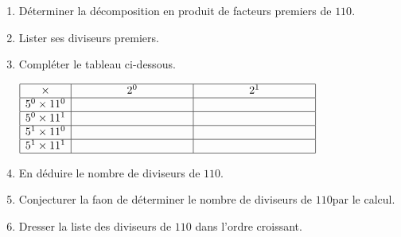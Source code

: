 \begin{exercice*}
    \begin{enumerate}
        \item Déterminer la décomposition en produit de facteurs premiers de $110$.
        \item Lister ses diviseurs premiers.
        \item Compléter le tableau ci-dessous.
        
        \smallskip
        $\renewcommand{\arraystretch}{1}
        \begin{array}{|c|c|c|}
        \hline
        \times & \phantom{plusLarge}2^{0}\phantom{plusLarge} & \phantom{plusLarge}2^{1}\phantom{plusLarge}\\
        \hline
        5^{0}\times11^{0} &  & \\
        \hline
        5^{0}\times11^{1} &  & \\
        \hline
        5^{1}\times11^{0} &  & \\
        \hline
        5^{1}\times11^{1} &  & \\
        \hline
        \end{array}
        \renewcommand{\arraystretch}{1}$
        \smallskip

        \item En déduire le nombre de diviseurs de $110$.
        \item Conjecturer la faon de déterminer le nombre de diviseurs de $110$par le calcul.
        \item Dresser la liste des diviseurs de $110$ dans l'ordre croissant.
    \end{enumerate}

\end{exercice*}
